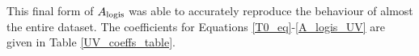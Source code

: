 \documentclass[12pt, a4paper]{report}
\begin{document}

This final form of $A_{\textnormal{logis}}$ was able to accurately reproduce the behaviour of almost the entire dataset. The coefficients for Equations \ref{T0_eq}-\ref{A_logis_UV} are given in Table \ref{UV_coeffs_table}.
\end{document}
